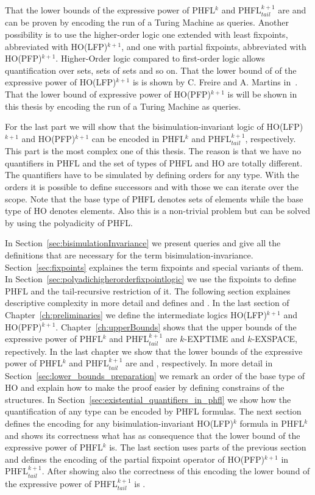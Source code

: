 That the lower bounds of the expressive power of PHFL$^k$ and PHFL$^{k+1}_{tail}$ are  and  can be proven by encoding the run of a Turing Machine as queries. Another possibility is to use the higher-order logic one extended with least fixpoints, abbreviated with HO(LFP)$^{k+1}$, and one with partial fixpoints, abbreviated with HO(PFP)$^{k+1}$. Higher-Order logic compared to first-order logic allows quantification over sets, sets of sets and so on. That the lower bound of of the expressive power of HO(LFP)$^{k+1}$ is  is shown by C. Freire and A. Martins in~\cite{freireMartins2011descriptive}. That the lower bound of expressive power of HO(PFP)$^{k+1}$ is  will be shown in this thesis by encoding the run of a Turing Machine as queries.

For the last part we will show that the bisimulation-invariant logic of HO(LFP)$^{k+1}$ and HO(PFP)$^{k+1}$ can be encoded in PHFL$^k$ and PHFL$^{k+1}_{tail}$, respectively. This part is the most complex one of this thesis. The reason is that we have no quantifiers in PHFL and the set of types of PHFL and HO are totally different. The quantifiers have to be simulated by defining orders for any type. With the orders it is possible to define successors and with those we can iterate over the scope. Note that the base type of PHFL denotes sets of elements while the base type of HO denotes elements. Also this is a non-trivial problem but can be solved by using the polyadicity of PHFL. 

In Section~\ref{sec:bisimulationInvariance} we present queries and give all the definitions that are necessary for the term bisimulation-invariance. Section~\ref{sec:fixpoints} explaines the term fixpoints and special variants of them. In Section~\ref{sec:polyadichigherorderfixpointlogic} we use the fixpoints to define PHFL and the tail-recursive restriction of it. The following section explaines descriptive complexity in more detail and defines  and . In the last section of Chapter~\ref{ch:preliminaries} we define the intermediate logics HO(LFP)$^{k+1}$ and HO(PFP)$^{k+1}$. Chapter~\ref{ch:upperBounds} shows that the upper bounds of the expressive power of PHFL$^k$ and PHFL$^{k+1}_{tail}$ are $k$-EXPTIME and $k$-EXSPACE, repectively. In the last chapter we show that the lower bounds of the expressive power of PHFL$^k$ and PHFL$^{k+1}_{tail}$ are  and , respectively. In more detail in Section~\ref{sec:lower_bounds_preparation} we remark an order of the base type of HO and explain how to make the proof easier by defining constrains of the structures. In Section~\ref{sec:existential_quantifiers_in_phfl} we show how the quantification of any type can be encoded by PHFL formulas. The next section defines the encoding for any bisimulation-invariant HO(LFP)$^k$ formula in PHFL$^k$ and shows its correctness what has as consequence that the lower bound of the expressive power of PHFL$^k$ is. The last section uses parts of the previous section and defines the encoding of the partial fixpoint operator of HO(PFP)$^{k+1}$ in PHFL$^{k+1}_{tail}$. After showing also the correctness of this encoding the lower bound of the expressive power of PHFL$^{k+1}_{tail}$ is .